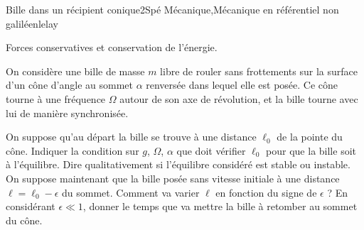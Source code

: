 
\begin{exercise}{Bille dans un récipient conique}{2}{Spé}
{Mécanique,Mécanique en référentiel non galiléen}{lelay}

\begin{questions}
    \questioncours Forces conservatives et conservation de l'énergie.
\begin{EnvUplevel}
On considère une bille de masse $m$ libre de rouler sans frottements sur la surface d'un cône d'angle au sommet $\alpha$ renversée dans lequel elle est posée. Ce cône tourne à une fréquence $\Omega$ autour de son axe de révolution, et la bille tourne avec lui de manière synchronisée.
\end{EnvUplevel}
    \question On suppose qu'au départ la bille se trouve à une distance $\ell_0$ de la pointe du cône. Indiquer la condition sur $g$, $\Omega$, $\alpha$ que doit vérifier $\ell_0$ pour que la bille soit à l'équilibre. 
    \question Dire qualitativement si l'équilibre considéré est stable ou instable.
    \question On suppose maintenant que la bille posée sans vitesse initiale à une distance $\ell = \ell_0 - \epsilon$ du sommet. Comment va varier $\ell$ en fonction du signe de $\epsilon$ ?
    \question En considérant $\epsilon \ll 1$, donner le temps que va mettre la bille à retomber au sommet du cône.
\end{questions}
\end{exercise}